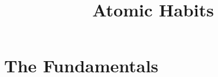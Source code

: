 \documentclass[10pt,twocolumn]{../notes}
\title{Atomic Habits}
\begin{document}
\maketitle
\tableofcontents
\section{The Fundamentals}
\end{document}
